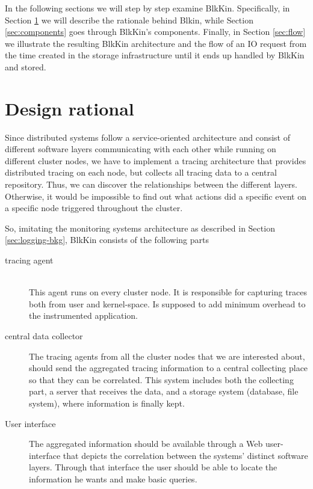 In the following sections we will step by step examine BlkKin. Specifically, in
Section \ref{sec:rationale} we will describe the rationale behind Blkin, while
Section \ref{sec:components} goes through BlkKin's components. Finally, in
Section \ref{sec:flow} we illustrate the resulting BlkKin architecture and the
flow of an IO request from the time created in the storage infrastructure until
it ends up handled by BlkKin and stored.

\section{Design rational}\label{sec:rationale}

Since distributed systems follow a service-oriented architecture and consist of
different software layers communicating with each other while running on
different cluster nodes, we have to implement a tracing architecture that
provides distributed tracing on each node, but collects all tracing data to a
central repository. Thus, we can discover the relationships between the
different layers. Otherwise, it would be impossible to find out what actions did
a specific event on a specific node triggered throughout the cluster.

So, imitating the monitoring systems architecture as described in Section
\ref{sec:logging-bkg}, BlkKin consists of the following parts

\begin{description}
\item[tracing agent] \hfill \\
This agent runs on every cluster node. It is responsible for capturing traces
both from user and kernel-space. Is supposed to add minimum overhead to the
instrumented application.

\item[central data collector]
The tracing agents from all the cluster nodes that we are interested about,
should send the aggregated tracing information to a central collecting place so
that they can be correlated. This system includes both the collecting part, a
server that receives the data, and a storage system (database, file system),
where information is finally kept.

\item[User interface]
The aggregated information should be available through a Web user-interface that
depicts the correlation between the systems' distinct software layers. Through
that interface the user should be able to locate the information he wants and
make basic queries.

\end{description}

